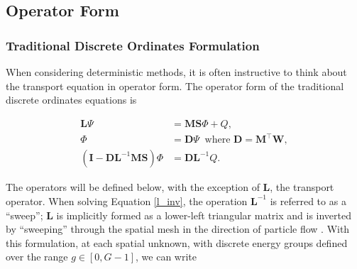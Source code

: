 \documentclass{article} %
\newcommand{\ve}[1]{\ensuremath{\mathbf{#1}}}
\begin{document}
\subsection{Operator Form}
\subsubsection{Traditional Discrete Ordinates Formulation}

When considering deterministic methods, it is often instructive to think about
the transport equation in operator form. The 
operator form of the traditional discrete ordinates equations is

\begin{align}
\ve{L}\Psi &= \ve{MS}\Phi + Q, \\
\Phi &= \ve{D}\Psi\: \text{ where } \ve{D} = \ve{M}^\top\ve{W}, \\
\left(\ve{I} - \ve{DL}^{-1}\ve{MS}\right)\Phi &= \ve{DL}^{-1}Q.
\label{l_inv}
\end{align}

\noindent The operators will be defined below, with the exception of $\ve{L}$,
the transport operator. When solving Equation \ref{l_inv}, the operation
$\ve{L}^{-1}$ is referred to as a ``sweep''; $\ve{L}$ is implicitly formed as a
lower-left triangular matrix and is inverted by ``sweeping'' through the
spatial mesh in the direction of particle flow \cite{exmm}.
With this formulation, at each spatial unknown, with discrete energy groups
defined over the range $g\in[0,G-1]$, we can write
\end{document}
